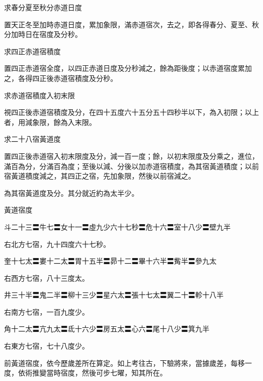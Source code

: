 \begin{pinyinscope}
 求春分夏至秋分赤道日度



 置天正冬至加時赤道日度，累加象限，滿赤道宿次，去之，即各得春分、夏至、秋分加時日在宿度及分秒。



 求四正赤道宿積度



 置四正赤道宿全度，以四正赤道日度及分秒減之，餘為距後度；以赤道宿度累加之，各得四正後赤道宿積度及分秒。



 求赤道宿積度入初末限



 視四正後赤道宿積度及分，在四十五度六十五分五十四秒半以下，為入初限；以上者，用減象限，餘為入末限。



 求二十八宿黃道度



 置四正後赤道宿入初末限度及分，減一百一度；餘，以初末限度及分乘之，進位，滿百為分，分滿百為度；至後以減、分後以加赤道宿積度，為其宿黃道積度；以前宿黃道積度減之，其四正之宿，先加象限，然後以前宿減之。



 為其宿黃道度及分。其分就近約為太半少。



 黃道宿度



 斗二十三〓牛七〓女十一〓虛九少六十七秒〓危十六〓室十八少〓壁九半



 右北方七宿，九十四度六十七秒。



 奎十七太〓婁十二太〓胃十五半〓昴十二〓畢十六半〓觜半〓參九太



 右西方七宿，八十三度太。



 井三十半〓鬼二半〓柳十三少〓星六太〓張十七太〓翼二十〓軫十八半



 右南方七宿，一百九度少。



 角十二太〓亢九太〓氐十六少〓房五太〓心六〓尾十八少〓箕九半



 右東方七宿，七十八度少。



 前黃道宿度，依今歷歲差所在算定。如上考往古，下驗將來，當據歲差，每移一度，依術推變當時宿度，然後可步七曜，知其所在。




\end{pinyinscope}
